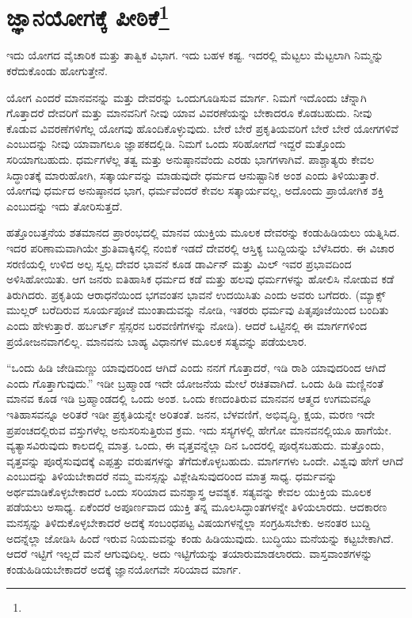 
\chapter[ಜ್ಞಾನಯೋಗಕ್ಕೆ ಪೀಠಿಕೆ]{ಜ್ಞಾನಯೋಗಕ್ಕೆ ಪೀಠಿಕೆ\protect\footnote{}}

ಇದು ಯೋಗದ ವೈಚಾರಿಕ ಮತ್ತು ತಾತ್ವಿಕ ವಿಭಾಗ. ಇದು ಬಹಳ ಕಷ್ಟ. ಇದರಲ್ಲಿ ಮೆಟ್ಟಲು ಮೆಟ್ಟಲಾಗಿ ನಿಮ್ಮನ್ನು ಕರೆದುಕೊಂಡು ಹೋಗುತ್ತೇನೆ.

ಯೋಗ ಎಂದರೆ ಮಾನವನನ್ನು ಮತ್ತು ದೇವರನ್ನು ಒಂದುಗೂಡಿಸುವ ಮಾರ್ಗ. ನಿಮಗೆ ಇದೊಂದು ಚೆನ್ನಾಗಿ ಗೊತ್ತಾದರೆ ದೇವರಿಗೆ ಮತ್ತು ಮಾನವನಿಗೆ ನೀವು ಯಾವ ವಿವರಣೆಯನ್ನು ಬೇಕಾದರೂ ಕೊಡಬಹುದು. ನೀವು ಕೊಡುವ ವಿವರಣೆಗಳಿಗೆಲ್ಲ ಯೋಗವು ಹೊಂದಿಕೊಳ್ಳುವುದು. ಬೇರೆ ಬೇರೆ ಪ್ರಕೃತಿಯವರಿಗೆ ಬೇರೆ ಬೇರೆ ಯೋಗಗಳಿವೆ ಎಂಬುದನ್ನು ನೀವು ಯಾವಾಗಲೂ ಜ್ಞಾಪಕದಲ್ಲಿಡಿ. ನಿಮಗೆ ಒಂದು ಸರಿಹೋಗದೆ ಇದ್ದರೆ ಮತ್ತೊಂದು ಸರಿಯಾಗಬಹುದು. ಧರ್ಮಗಳೆಲ್ಲ ತತ್ವ ಮತ್ತು ಅನುಷ್ಠಾನವೆಂದು ಎರಡು ಭಾಗಗಳಾಗಿವೆ. ಪಾಶ್ಚಾತ್ಯರು ಕೇವಲ ಸಿದ್ಧಾಂತಕ್ಕೆ ಮಾರುಹೋಗಿ, ಸತ್ಕಾರ್ಯವನ್ನು ಮಾಡುವುದೇ ಧರ್ಮದ ಆನುಷ್ಟಾನಿಕ ಅಂಶ ಎಂದು ತಿಳಿಯುತ್ತಾರೆ. ಯೋಗವು ಧರ್ಮದ ಅನುಷ್ಠಾನದ ಭಾಗ, ಧರ್ಮವೆಂದರೆ ಕೇವಲ ಸತ್ಕಾರ್ಯವಲ್ಲ, ಅದೊಂದು ಪ್ರಾಯೋಗಿಕ ಶಕ್ತಿ ಎಂಬುದನ್ನು ಇದು ತೋರಿಸುತ್ತದೆ.

ಹತ್ತೊಂಬತ್ತನೆಯ ಶತಮಾನದ ಪ್ರಾರಂಭದಲ್ಲಿ ಮಾನವ ಯುಕ್ತಿಯ ಮೂಲಕ ದೇವರನ್ನು ಕಂಡುಹಿಡಿಯಲು ಯತ್ನಿಸಿದ. ಇದರ ಪರಿಣಾಮವಾಗಿಯೇ ಶ್ರುತಿ\break ವಾಕ್ಕಿನಲ್ಲಿ ನಂಬಿಕೆ ಇಡದೆ ದೇವರಲ್ಲಿ ಆಸ್ತಿಕ್ಯ ಬುದ್ದಿಯನ್ನು ಬೆಳೆಸಿದರು. ಈ ವಿಚಾರ ಸರಣಿಯಲ್ಲಿ ಉಳಿದ ಅಲ್ಪ ಸ್ವಲ್ಪ ದೇವರ ಭಾವನೆ ಕೂಡ ಡಾರ್ವಿನ್ ಮತ್ತು ಮಿಲ್ ಇವರ ಪ್ರಭಾವದಿಂದ ಅಳಿಸಿಹೋಯಿತು. ಆಗ ಜನರು ಐತಿಹಾಸಿಕ ಧರ್ಮದ ಕಡೆ ಮತ್ತು ಹಲವು ಧರ್ಮಗಳನ್ನು ಹೋಲಿಸಿ ನೋಡುವ ಕಡೆ ತಿರುಗಿದರು. ಪ್ರಕೃತಿಯ ಆರಾಧನೆಯಿಂದ ಭಗವಂತನ ಭಾವನೆ ಉದಯಿಸಿತು ಎಂದು ಅವರು ಬಗೆದರು. (ಮ್ಯಾಕ್ಸ್ ಮುಲ್ಲರ್ ಬರೆದಿರುವ ಸೂರ್ಯಪೂಜೆ ಮುಂತಾದುವನ್ನು ನೋಡಿ, ಇತರರು ಧರ್ಮವು ಪಿತೃಪೂಜೆಯಿಂದ ಬಂದಿತು ಎಂದು ಹೇಳುತ್ತಾರೆ. ಹರ್ಬರ್ಟ್ ಸ್ಪೆನ್ಸರನ ಬರವಣಿಗೆಗಳನ್ನು ನೋಡಿ). ಆದರೆ ಒಟ್ಟಿನಲ್ಲಿ ಈ ಮಾರ್ಗಗಳಿಂದ ಪ್ರಯೋಜನವಾಗಲಿಲ್ಲ. ಮಾನವನು ಬಾಹ್ಯ ವಿಧಾನಗಳ ಮೂಲಕ ಸತ್ಯವನ್ನು ಪಡೆಯಲಾರ.

“ಒಂದು ಹಿಡಿ ಜೇಡಿಮಣ್ಣು ಯಾವುದರಿಂದ ಆಗಿದೆ ಎಂದು ನನಗೆ ಗೊತ್ತಾದರೆ, ಇಡಿ ರಾಶಿ ಯಾವುದರಿಂದ ಆಗಿದೆ ಎಂದು ಗೊತ್ತಾಗುವುದು.” ಇಡೀ ಬ್ರಹ್ಮಾಂಡ ಇದೇ ಯೋಜನೆಯ ಮೇಲೆ ರಚಿತವಾಗಿದೆ. ಒಂದು ಹಿಡಿ ಮಣ್ಣಿನಂತೆ ಮಾನವ ಕೂಡ ಇಡಿ ಬ್ರಹ್ಮಾಂಡದಲ್ಲಿ ಒಂದು ಅಂಶ. ಒಂದು ಕಣದಂತಿರುವ ಮಾನವನ ಆತ್ಮದ ಉಗಮವನ್ನೂ ಇತಿಹಾಸವನ್ನೂ ಅರಿತರೆ ಇಡೀ ಪ್ರಕೃತಿಯನ್ನೇ ಅರಿತಂತೆ. ಜನನ, ಬೆಳವಣಿಗೆ, ಅಭಿವೃದ್ಧಿ, ಕ್ಷಯ, ಮರಣ ಇದೇ ಪ್ರಪಂಚದಲ್ಲಿರುವ ವಸ್ತುಗಳೆಲ್ಲ ಅನುಸರಿಸುತ್ತಿರುವ ಕ್ರಮ. ಇದು ಸಸ್ಯಗಳಲ್ಲಿ ಹೇಗೋ ಮಾನವನಲ್ಲಿಯೂ ಹಾಗೆಯೇ. ವ್ಯತ್ಯಾಸವಿರುವುದು ಕಾಲದಲ್ಲಿ ಮಾತ್ರ. ಒಂದು, ಈ ವೃತ್ತವನ್ನೆಲ್ಲಾ ದಿನ ಒಂದರಲ್ಲಿ ಪೂರೈಸಬಹುದು. ಮತ್ತೊಂದು, ವೃತ್ತವನ್ನು ಪೂರೈಸುವುದಕ್ಕೆ ಎಪ್ಪತ್ತು ವರುಷಗಳನ್ನು ತೆಗೆದುಕೊಳ್ಳಬಹುದು. ಮಾರ್ಗಗಳು ಒಂದೇ. ವಿಶ್ವವು ಹೇಗೆ ಆಗಿದೆ ಎಂಬುದನ್ನು ತಿಳಿಯಬೇಕಾದರೆ ನಮ್ಮ ಮನಸ್ಸನ್ನು ವಿಶ್ಲೇಷಿಸುವುದರಿಂದ ಮಾತ್ರ ಸಾಧ್ಯ. ಧರ್ಮವನ್ನು ಅರ್ಥಮಾಡಿಕೊಳ್ಳಬೇಕಾದರೆ ಒಂದು ಸರಿಯಾದ ಮನಶ್ಶಾಸ್ತ್ರ ಆವಶ್ಯಕ. ಸತ್ಯವನ್ನು ಕೇವಲ ಯುಕ್ತಿಯ ಮೂಲಕ ಪಡೆಯಲು ಅಸಾಧ್ಯ. ಏಕೆಂದರೆ ಅಪೂರ್ಣವಾದ ಯುಕ್ತಿ ತನ್ನ ಮೂಲಸಿದ್ಧಾಂತಗಳನ್ನೇ ತಿಳಿಯಲಾರದು. ಆದಕಾರಣ ಮನಸ್ಸನ್ನು ತಿಳಿದುಕೊಳ್ಳಬೇಕಾದರೆ ಅದಕ್ಕೆ ಸಂಬಂಧಪಟ್ಟ ವಿಷಯಗಳನ್ನೆಲ್ಲಾ ಸಂಗ್ರಹಿಸಬೇಕು. ಅನಂತರ ಬುದ್ದಿ ಅದನ್ನೆಲ್ಲಾ ಜೋಡಿಸಿ ಹಿಂದೆ ಇರುವ ನಿಯಮವನ್ನು ಕಂಡು ಹಿಡಿಯುವುದು. ಬುದ್ಧಿಯು ಮನೆಯನ್ನು ಕಟ್ಟಬೇಕಾಗಿದೆ. ಆದರೆ ಇಟ್ಟಿಗೆ ಇಲ್ಲದೆ ಮನೆ ಆಗುವುದಿಲ್ಲ. ಅದು ಇಟ್ಟಿಗೆಯನ್ನು ತಯಾರುಮಾಡಲಾರದು. ವಾಸ್ತವಾಂಶಗಳನ್ನು ಕಂಡುಹಿಡಿಯಬೇಕಾದರೆ ಅದಕ್ಕೆ ಜ್ಞಾನಯೋಗವೇ ಸರಿಯಾದ ಮಾರ್ಗ.

